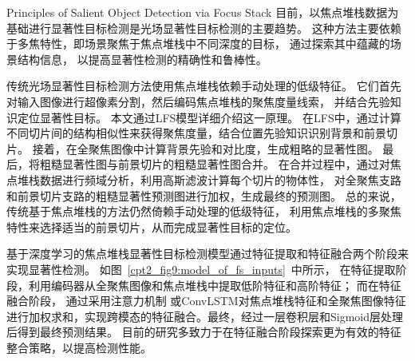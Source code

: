 {Principles of Salient Object Detection via Focus Stack}
%
%
%
%
目前，以焦点堆栈数据为基础进行显著性目标检测是光场显著性目标检测的主要趋势。
这种方法主要依赖于多焦特性，即场景聚焦于焦点堆栈中不同深度的目标，
通过探索其中蕴藏的场景结构信息，
以提高显著性检测的精确性和鲁棒性。
\par 
%
%
%
%
传统光场显著性目标检测方法使用焦点堆栈依赖手动处理的低级特征。
它们首先对输入图像进行超像素分割，然后编码焦点堆栈的聚焦度量线索，
并结合先验知识定位显著性目标。
本文通过LFS模型详细介绍这一原理。
在LFS中，通过计算不同切片间的结构相似性来获得聚焦度量，结合位置先验知识识别背景和前景切片。
接着，在全聚焦图像中计算背景先验和对比度，生成粗略的显著性图。
最后，将粗糙显著性图与前景切片的粗糙显著性图合并。
在合并过程中，通过对焦点堆栈数据进行频域分析，利用高斯滤波计算每个切片的物体性，
对全聚焦支路和前景切片支路的粗糙显著性预测图进行加权，生成最终的预测图。
总的来说，传统基于焦点堆栈的方法仍然倚赖手动处理的低级特征，
利用焦点堆栈的多聚焦特性来选择适当的前景切片，从而完成显著性目标的定位。\par
%
%
%
%
基于深度学习的焦点堆栈显著性目标检测模型通过特征提取和特征融合两个阶段来实现显著性检测。
如图~\ref{cpt2_fig9:model_of_fs_inputs}~中所示，
在特征提取阶段，利用编码器从全聚焦图像和焦点堆栈中提取低阶特征和高阶特征；
而在特征融合阶段，
通过采用注意力机制
或ConvLSTM对焦点堆栈特征和全聚焦图像特征进行加权求和，实现跨模态的特征融合。最终，经过一层卷积层和Sigmoid层处理后得到最终预测结果。
目前的研究多致力于在特征融合阶段探索更为有效的特征整合策略，以提高检测性能。
%
%
%
